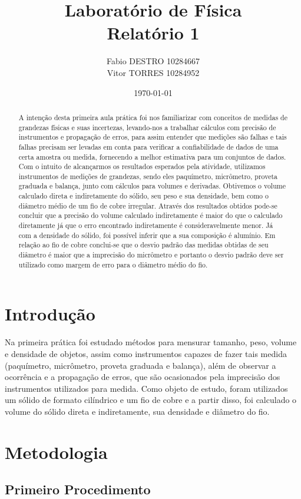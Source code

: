 \documentclass{article}
\title{{\huge Laboratório de Física}\\{\Large Relatório 1}}
\author{Fabio DESTRO 10284667\\Vitor TORRES 10284952\\}
\date{\today}
\begin{document}
\begin{abstract}
	\indent
	A intenção desta primeira aula prática foi nos familiarizar com conceitos de medidas de grandezas físicas e suas incertezas, levando-nos a trabalhar cálculos com precisão de instrumentos e propagação de erros,
	para assim entender que medições são falhas e tais falhas precisam ser levadas em conta para verificar a confiabilidade de dados de uma certa amostra ou medida, fornecendo a melhor estimativa para um conjuntos de dados.
	Com o intuito de alcançarmos os resultados esperados pela atividade, utilizamos instrumentos de medições de grandezas, sendo eles paquímetro, micrômetro, proveta graduada e balança, junto com cálculos para volumes e derivadas.
	Obtivemos o volume calculado direta e indiretamente do sólido, seu peso e sua densidade, bem como o diâmetro médio de um fio de cobre irregular.
	Através dos resultados obtidos pode-se concluir que a precisão do volume calculado indiretamente é maior do que o calculado diretamente já que o erro encontrado indiretamente é consideravelmente menor. Já com a densidade do sólido, foi possível inferir que a sua composição é alumínio. Em relação ao fio de cobre conclui-se que o desvio padrão das medidas obtidas de seu diâmetro é maior que a imprecisão do micrômetro e portanto o desvio padrão deve ser utilizado como margem de erro para o diâmetro médio do fio.

\end{abstract}
\newpage
\section{Introdução}
\indent

Na primeira prática foi estudado métodos para mensurar tamanho, peso, volume e densidade de objetos, assim como instrumentos capazes de fazer tais medida (paquímetro, micrômetro, proveta graduada e balança), além de observar a ocorrência e a propagação de erros, que são ocasionados pela imprecisão dos instrumentos utilizados para medida.
Como objeto de estudo, foram utilizados um sólido de formato cilíndrico e um fio de cobre e a partir disso, foi calculado o volume do sólido direta e indiretamente, sua densidade e diâmetro do fio.

\section{Metodologia}
\subsection{Primeiro Procedimento}
\indent
\end{document}
